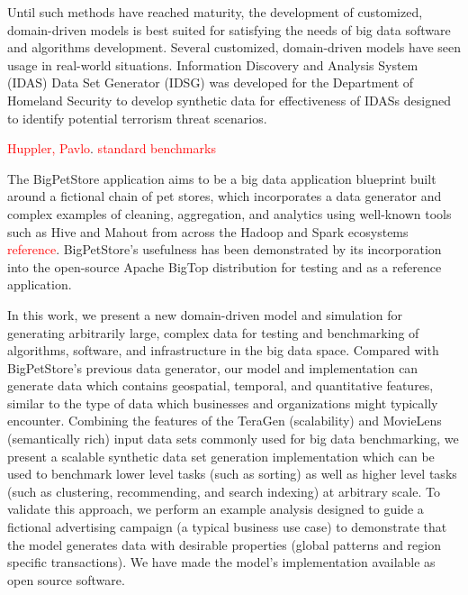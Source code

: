 \documentclass[conference]{IEEEtran}
\begin{document}
Until such methods have reached maturity, the development of customized, domain-driven models is best suited for satisfying the needs of big data software and algorithms development. Several customized, domain-driven models have seen usage in real-world situations.  Information Discovery and Analysis System (IDAS) Data Set Generator (IDSG) \cite{Jeske2005,Lin2006} was developed for the Department of Homeland Security to develop synthetic data for effectiveness of IDASs designed to identify potential terrorism threat scenarios.

\textcolor{red}{Huppler, Pavlo}.  \textcolor{red}{standard benchmarks}

The BigPetStore application aims to be a big data application blueprint built around a fictional chain of pet stores, which incorporates a data generator and complex examples of cleaning, aggregation, and analytics using well-known tools such as Hive and Mahout from across the Hadoop and Spark ecosystems \textcolor{red}{reference}. BigPetStore's usefulness has been demonstrated by its incorporation into the open-source Apache BigTop distribution \cite{BigTop} for testing and as a reference application.  

In this work, we present a new domain-driven model and simulation for generating arbitrarily large, complex data for testing and benchmarking of algorithms, software, and infrastructure in the big data space. Compared with BigPetStore's previous data generator, our model and implementation can generate data which contains geospatial, temporal, and quantitative features, similar to the type of data which businesses and organizations might typically encounter.  Combining the features of the TeraGen (scalability)  and MovieLens \cite{MovieLens} (semantically rich) input data sets commonly used for big data benchmarking, we present a scalable synthetic data set generation implementation which can be used to benchmark lower level tasks (such as sorting) as well as higher level tasks (such as clustering, recommending, and search indexing) at arbitrary scale.  To validate this approach, we perform an example analysis designed to guide a fictional advertising campaign (a typical business use case) to demonstrate that the model generates data with desirable properties (global patterns and region specific transactions).  We have made the model's implementation available as open source software.

\end{document}

